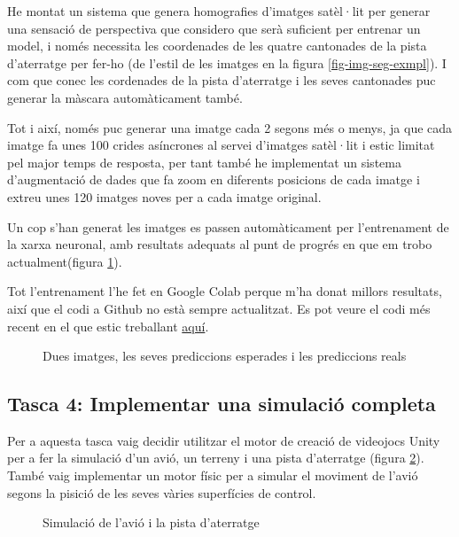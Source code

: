 \documentclass[10pt,a4paper,twocolumn,twoside]{article}
\begin{document}
He montat un sistema que genera homografies d'imatges satèl·lit per generar una sensació de perspectiva que considero que serà suficient per entrenar
un model, i només necessita les coordenades de les quatre cantonades de la pista d'aterratge per fer-ho
(de l'estil de les imatges en la figura \ref{fig-img-seg-exmpl}).
I com que conec les cordenades de la pista d'aterratge i les seves cantonades puc generar la màscara automàticament també.

Tot i així, només puc generar una imatge cada 2 segons més o menys, ja que cada imatge fa unes 100 crides asíncrones al servei d'imatges satèl·lit i estic
limitat pel major temps de resposta, per tant també he implementat un sistema d'augmentació de dades que fa zoom en diferents posicions de cada
imatge i extreu unes 120 imatges noves per a cada imatge original.


Un cop s'han generat les imatges es passen automàticament per l'entrenament de la xarxa neuronal, amb resultats adequats al punt de progrés en que
em trobo actualment(figura \ref{fig-pred-exmpl}).

Tot l'entrenament l'he fet en Google Colab perque m'ha donat millors resultats, així que el codi a Github no està sempre actualitzat.
Es pot veure el codi més recent en el que estic treballant \href{https://colab.research.google.com/drive/1fX-1lhTc6W_ACkCkY24vqCnT4GJXCWct?usp=sharing}{aquí}.

\begin{figure}[h]
\centering
{}
    \caption{Dues imatges, les seves prediccions esperades i les prediccions reals}
    \label{fig-pred-exmpl}
\end{figure}

\subsection{Tasca 4: Implementar una simulació completa}
Per a aquesta tasca vaig decidir utilitzar el motor de creació de videojocs Unity per a fer la simulació d'un avió, un terreny i una pista
d'aterratge (figura \ref{fig-simulador}). També vaig implementar un motor físic per a simular el moviment de l'avió segons la pisició de les seves
vàries superfícies de control.
\begin{figure}[h]
\centering
{}
    \caption{Simulació de l'avió i la pista d'aterratge}
    \label{fig-simulador}
\end{figure}
\end{document}
